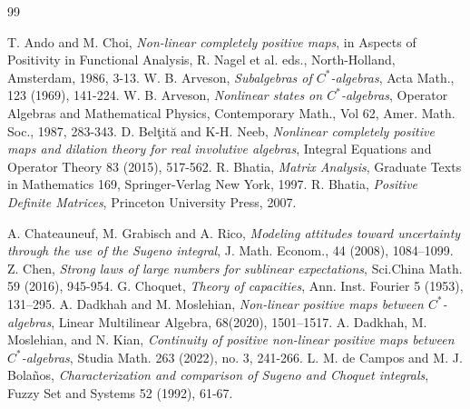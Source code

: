 \documentclass[a4paper,12pt]{amsart}
\begin{document}
\begin{thebibliography}{99}

T. Ando and M. Choi, 
\textit{Non-linear completely positive maps}, 
in Aspects of Positivity in Functional Analysis, R. Nagel et al. eds., 
North-Holland, Amsterdam, 1986, 3-13.
W. B. Arveson, 
\textit{Subalgebras of $C^*$-algebras},
Acta Math., 123 (1969), 141-224. 
W. B. Arveson, 
\textit{Nonlinear states on $C^*$-algebras},
Operator Algebras and Mathematical Physics, Contemporary Math., 
Vol 62, Amer. Math. Soc., 1987, 283-343. 
D. Bel\c{t}it\u{a} and K-H. Neeb, 
\textit{Nonlinear completely positive maps and dilation theory for real involutive algebras},
Integral Equations and Operator Theory 83 (2015), 517-562.
R. Bhatia,
\textit{Matrix Analysis},
Graduate Texts in Mathematics 169,
Springer-Verlag New York, 1997.
R. Bhatia,
\textit{Positive Definite Matrices},
Princeton University Press, 2007.


A. Chateauneuf, M. Grabisch and A. Rico, 
\textit{Modeling attitudes toward uncertainty through the use of the Sugeno integral}, 
J. Math. Econom., 44 (2008), 1084--1099. 
Z. Chen, 
\textit{Strong laws of large numbers for sublinear expectations}, 
Sci.China Math. 59 (2016), 945-954.
G. Choquet, 
\textit{Theory of capacities},
Ann. Inst. Fourier 5 (1953), 131--295. 
A. Dadkhah and M. Moslehian,
\textit{Non-linear positive maps between $C^*$-algebras},
Linear Multilinear Algebra, 68(2020), 1501--1517.
A. Dadkhah, M. Moslehian, and N. Kian, 
\textit{Continuity of positive non-linear positive maps between $C^*$-algebras}, 
Studia Math. 263 (2022), no. 3, 241-266.
L. M. de Campos and M. J. Bola\~{n}os, 
\textit{Characterization and comparison of Sugeno and Choquet integrals}, 
Fuzzy Set and Systems 52 (1992), 61-67.


\end{thebibliography}
\end{document}
